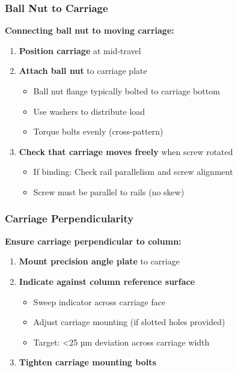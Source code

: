 \documentclass[
]{article}
\providecommand{\tightlist}{%
  \setlength{\itemsep}{0pt}\setlength{\parskip}{0pt}}
\begin{document}
\subsubsection{Ball Nut to Carriage}\label{ball-nut-to-carriage}

\textbf{Connecting ball nut to moving carriage:}

\begin{enumerate}
\def\labelenumi{\arabic{enumi}.}
\tightlist
\item
  \textbf{Position carriage} at mid-travel
\item
  \textbf{Attach ball nut} to carriage plate

  \begin{itemize}
  \tightlist
  \item
    Ball nut flange typically bolted to carriage bottom
  \item
    Use washers to distribute load
  \item
    Torque bolts evenly (cross-pattern)
  \end{itemize}
\item
  \textbf{Check that carriage moves freely} when screw rotated

  \begin{itemize}
  \tightlist
  \item
    If binding: Check rail parallelism and screw alignment
  \item
    Screw must be parallel to rails (no skew)
  \end{itemize}
\end{enumerate}

\subsubsection{Carriage
Perpendicularity}\label{carriage-perpendicularity}

\textbf{Ensure carriage perpendicular to column:}

\begin{enumerate}
\def\labelenumi{\arabic{enumi}.}
\tightlist
\item
  \textbf{Mount precision angle plate} to carriage
\item
  \textbf{Indicate against column reference surface}

  \begin{itemize}
  \tightlist
  \item
    Sweep indicator across carriage face
  \item
    Adjust carriage mounting (if slotted holes provided)
  \item
    Target: \textless25 µm deviation across carriage width
  \end{itemize}
\item
  \textbf{Tighten carriage mounting bolts}
\end{enumerate}
\end{document}
